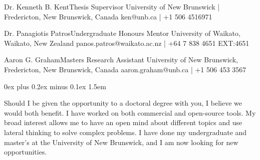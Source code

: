 \documentclass[9.5pt]{developercv} %
\begin{document}
\vspace*{\baselineskip}
\clearpage


\begin{entrylist}

    \entry%
        {Dr. Kenneth B. Kent}{Thesis Supervisor}
        {University of New Brunswick | Fredericton, New Brunswick, Canada}
        {ken@unb.ca | +1 506 4516971}

    \entry%
        {Dr. Panagiotis Patros}{Undergraduate Honours Mentor}
        {University of Waikato, Waikato, New Zealand}
        {panos.patros@waikato.ac.nz | +64 7 838 4651 EXT:4651}

    \entry%
        {Aaron G. Graham}{Masters Research Assistant}
        {University of New Brunswick, Fredericton, New Brunswick, Canada}
        {aaron.graham@unb.ca | +1 506 453 3567}

\end{entrylist}

\nocite{*}

\printbibliography[heading=pip, keyword=inprogresspapers]

\printbibliography[heading=pubp, keyword=publishedpapers]

\printbibliography[heading=diss, keyword=dissertations]

\printbibliography[heading=talks, keyword=talks]

\printbibliography[heading=poster, keyword=poster]

\clearpage



\large
\justifying
\parskip 0ex plus 0.2ex minus 0.1ex
\parindent1.5em
\fontsize{12}{24}\selectfont

Should I be given the opportunity to a doctoral degree with you, I believe we would both benefit.
I have worked on both commercial and open-source tools.
My broad interest allows me to have an open mind about different topics and use lateral thinking to solve complex problems.
I have done my undergraduate and master's at the University of New Brunswick, and I am now looking for new opportunities.
\end{document}
